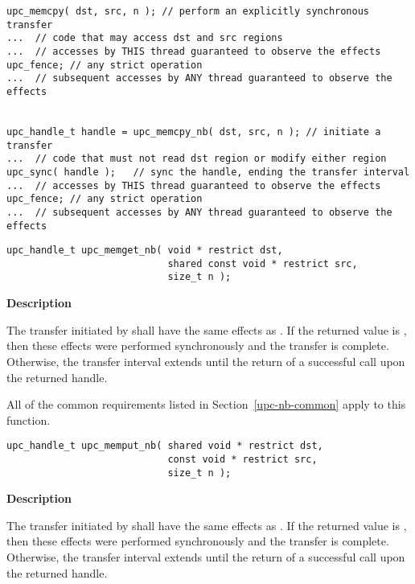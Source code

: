 \begin{verbatim}
upc_memcpy( dst, src, n ); // perform an explicitly synchronous transfer
...  // code that may access dst and src regions
...  // accesses by THIS thread guaranteed to observe the effects
upc_fence; // any strict operation
...  // subsequent accesses by ANY thread guaranteed to observe the effects


upc_handle_t handle = upc_memcpy_nb( dst, src, n ); // initiate a transfer 
...  // code that must not read dst region or modify either region
upc_sync( handle );   // sync the handle, ending the transfer interval
...  // accesses by THIS thread guaranteed to observe the effects
upc_fence; // any strict operation
...  // subsequent accesses by ANY thread guaranteed to observe the effects
\end{verbatim}
\vfill

\def\bfunc{upc\_memget\_nb}
\def\sfunc{\memget}
\funcheader

\begin{verbatim}
upc_handle_t upc_memget_nb( void * restrict dst,
                            shared const void * restrict src, 
                            size_t n );
\end{verbatim}

{\bf Description}

\np The transfer initiated by \func\args shall have the same effects as \sfunc\args.
If the returned value is \complete, then these effects were performed synchronously
and the transfer is complete. Otherwise, the transfer interval extends until
the return of a successful \sync call upon the returned handle.

\np All of the common requirements listed in Section~\ref{upc-nb-common} apply to this function.

\def\bfunc{upc\_memput\_nb}
\def\sfunc{\memput}
\funcheader

\begin{verbatim}
upc_handle_t upc_memput_nb( shared void * restrict dst,
                            const void * restrict src, 
                            size_t n );
\end{verbatim}

{\bf Description}

\np The transfer initiated by \func\args shall have the same effects as \sfunc\args.
If the returned value is \complete, then these effects were performed synchronously
and the transfer is complete. Otherwise, the transfer interval extends until
the return of a successful \sync call upon the returned handle.

